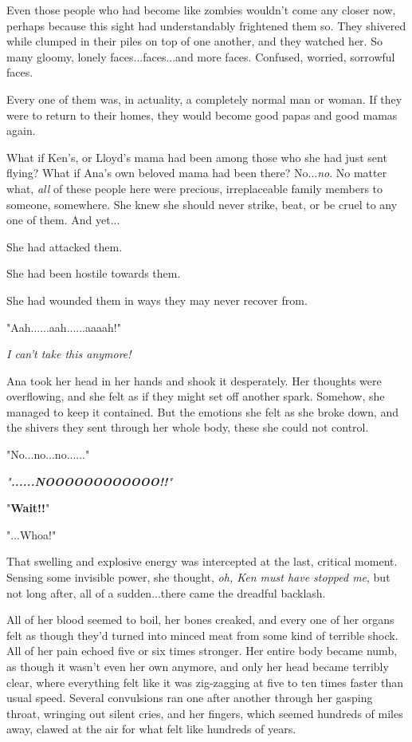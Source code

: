 \documentclass[
]{article}
\begin{document}
Even those people who had become like zombies wouldn't come any closer
now, perhaps because this sight had understandably frightened them so.
They shivered while clumped in their piles on top of one another, and
they watched her. So many gloomy, lonely faces...faces...and more faces.
Confused, worried, sorrowful faces.

Every one of them was, in actuality, a completely normal man or woman.
If they were to return to their homes, they would become good papas and
good mamas again.

What if Ken's, or Lloyd's mama had been among those who she had just
sent flying? What if Ana's own beloved mama had been there?
No...\emph{no}. No matter what, \emph{all} of these people here were
precious, irreplaceable family members to someone, somewhere. She knew
she should never strike, beat, or be cruel to any one of them. And
yet...

She had attacked them.

She had been hostile towards them.

She had wounded them in ways they may never recover from.

"Aah......aah......aaaah!"

\emph{I can't take this anymore!}

Ana took her head in her hands and shook it desperately. Her thoughts
were overflowing, and she felt as if they might set off another spark.
Somehow, she managed to keep it contained. But the emotions she felt as
she broke down, and the shivers they sent through her whole body, these
she could not control.

"No...no...no......"

\emph{"\textbf{......NOOOOOOOOOOOO!!}"}

"\textbf{Wait!!}"

"...Whoa!"

That swelling and explosive energy was intercepted at the last, critical
moment. Sensing some invisible power, she thought, \emph{oh, Ken must
have stopped me}, but not long after, all of a sudden...there came the
dreadful backlash.

All of her blood seemed to boil, her bones creaked, and every one of her
organs felt as though they'd turned into minced meat from some kind of
terrible shock. All of her pain echoed five or six times stronger. Her
entire body became numb, as though it wasn't even her own anymore, and
only her head became terribly clear, where everything felt like it was
zig-zagging at five to ten times faster than usual speed. Several
convulsions ran one after another through her gasping throat, wringing
out silent cries, and her fingers, which seemed hundreds of miles away,
clawed at the air for what felt like hundreds of years.
\end{document}
